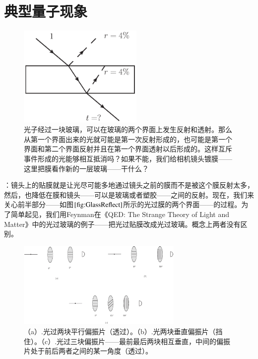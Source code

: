 \documentclass{ctexbook}
\newcommand{\FigLabel}[1]{\label{#1}}
\newcommand{\FigRef}[1]{图$\ref{#1}$}
\begin{document}
\section{典型量子现象}
\begin{figure}
\begin{center}
\includegraphics[width=6cm]{figure/GlassReflect.eps}
\caption[Feynman的光过玻璃示意图]{光子经过一块玻璃，可以在玻璃的两个界面上发生反射和透射。那么从第一个界面出来的光就可能是第一次反射形成的，也可能是第一个界面和第二个界面反射并且在第一个界面透射以后形成的。这样互斥事件形成的光能够相互抵消吗？如果不能，我们给相机镜头镀膜——这里把膜看作新的一层玻璃——干什么？}
\FigLabel{fig:GlassReflect}
\end{center}
\end{figure}

\begin{Experiment}
[相机镜头上的贴膜形成的光的干涉现象]：镜头上的贴膜就是让光尽可能多地通过镜头之前的膜而不是被这个膜反射太多\cite{Moghal:Antireflection}，然后，也降低在膜和镜头——可以是玻璃或者塑胶——之间的反射。现在，我们来关心前半部分——如\FigRef{fig:GlassReflect}所示的光过膜的两个界面——的过程。为了简单起见，我们用Feynman在《QED: The Strange Theory of Light and Matter》\cite{Feynman:Strange}中的光过玻璃的例子——把光过贴膜改成光过玻璃。概念上两者没有区别。
\end{Experiment}

\begin{figure}
\begin{center}
\includegraphics[width=8cm]{figure/Dirac3Polar}
\caption[Dirac的光三块偏振片]{（a）.光过两块平行偏振片（透过）。（b）.光两块垂直偏振片（挡住）。（c）.光过三块偏振片——最前最后两块相互垂直，中间的偏振片处于前后两者之间的某一角度（透过）。}
\FigLabel{fig:Dirac3Polar}
\end{center}
\end{figure}
\end{document}
